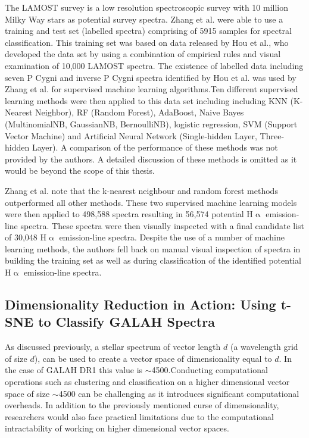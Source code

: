 The LAMOST survey is a low resolution spectroscopic survey with 10 million Milky Way stars as potential survey spectra. Zhang et al. were able to use a training and test set (labelled spectra) comprising of 5915 samples for spectral classification. This training set was based on data released by Hou et al.\cite{hou2016catalog}, who developed the data set by using a combination of empirical rules and visual examination of 10,000 LAMOST spectra. The existence of labelled data including seven P Cygni and inverse P Cygni spectra identified by Hou et al. was used by Zhang et al. for supervised machine learning algorithms.Ten different supervised learning methods were then applied to this data set including including KNN (K-Nearest Neighbor), RF (Random Forest), AdaBoost, Naive Bayes (MultinomialNB, GaussianNB, BernoulliNB), logistic regression, SVM (Support Vector Machine) and Artificial Neural Network (Single-hidden Layer, Three-hidden Layer)\cite{zhang2021catalog}. A comparison of the performance of these methods was not provided by the authors. A detailed discussion of these methods is omitted as it would be beyond the scope of this thesis. 

Zhang et al. note that the k-nearest neighbour and random forest methods outperformed all other methods. These two supervised machine learning models were then applied to 498,588 spectra resulting in 56,574 potential H$\upalpha$ emission-line spectra. These spectra were then visually inspected with a final candidate list of 30,048 H$\upalpha$ emission-line spectra. Despite the use of a number of machine learning methods, the authors fell back on manual visual inspection of spectra in building the training set as well as during classification of the identified potential H$\upalpha$ emission-line spectra.

\subsection{Dimensionality Reduction in Action: Using t-SNE to Classify GALAH Spectra}

As discussed previously, a stellar spectrum of vector length $d$ (a wavelength grid of size $d$), can be used to create a vector space of dimensionality equal to $d$. In the case of GALAH DR1 this value is $\sim$4500.Conducting computational operations such as clustering and classification on a higher dimensional vector space of size $\sim$4500 can be challenging as it introduces significant computational overheads. In addition to the previously mentioned curse of dimensionality, researchers would also face practical limitations due to the computational intractability of working on higher dimensional vector spaces.

